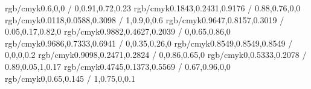 \newcommand{\targetcolourmodel}{cmyk} %
\selectcolormodel{\targetcolourmodel}

\definecolor{dtured}    {rgb/cmyk}{0.6,0,0 / 0,0.91,0.72,0.23}
\definecolor{blue}      {rgb/cmyk}{0.1843,0.2431,0.9176 / 0.88,0.76,0,0}
\definecolor{navyblue}  {rgb/cmyk}{0.0118,0.0588,0.3098 / 1,0.9,0,0.6}
\definecolor{yellow}    {rgb/cmyk}{0.9647,0.8157,0.3019 / 0.05,0.17,0.82,0}
\definecolor{orange}    {rgb/cmyk}{0.9882,0.4627,0.2039 / 0,0.65,0.86,0}
\definecolor{pink}      {rgb/cmyk}{0.9686,0.7333,0.6941 / 0,0.35,0.26,0}
\definecolor{grey}      {rgb/cmyk}{0.8549,0.8549,0.8549 / 0,0,0,0.2}
\definecolor{red}       {rgb/cmyk}{0.9098,0.2471,0.2824 / 0,0.86,0.65,0}
\definecolor{green}     {rgb/cmyk}{0,0.5333,0.2078 / 0.89,0.05,1,0.17}
\definecolor{purple}    {rgb/cmyk}{0.4745,0.1373,0.5569 / 0.67,0.96,0,0}
\definecolor{kaistblue} {rgb/cmyk}{0,0.65,0.145 / 1,0.75,0,0.1}

\newcommand{\dtulogocolour}{white} %
\newcommand{\frontpagetextcolour}{white} %



